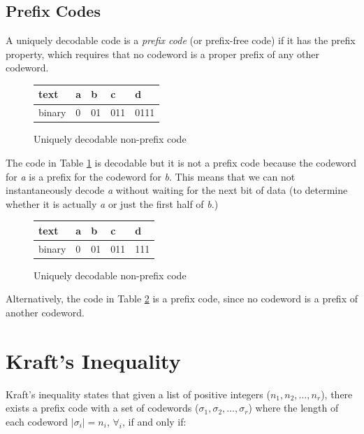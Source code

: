 \documentclass[11pt]{article}
\begin{document}
\subsection{Prefix Codes}
A uniquely decodable code is a \textit{prefix code} (or prefix-free code) if it has the prefix property, which requires that no codeword is a proper prefix of any other codeword.

\begin{figure}[h!]
\begin{center}
\begin{tabular}{| l | l | l | l | l |}
 \hline
  text   & a & b & c & d \\ \hline
  binary & 0 & 01 & 011 & 0111 \\ 
  \hline
\end{tabular}
\caption{Uniquely decodable non-prefix code}
\label{table:non_prefix_code}
\end{center}
\end{figure}

The code in Table \ref{table:non_prefix_code} is decodable but it is not a prefix code because the codeword for \textit{a} is a prefix for the codeword for \textit{b}. This means that we can not instantaneously decode \textit{a} without waiting for the next bit of data (to determine whether it is actually \textit{a} or just the first half of \textit{b}.)

\begin{figure}[h!]
\begin{center}
\begin{tabular}{| l | l | l | l | l |}
 \hline
  text   & a & b & c & d \\ \hline
  binary & 0 & 01 & 011 & 111 \\ 
  \hline
\end{tabular}
\caption{Uniquely decodable non-prefix code}
\label{table:prefix_code}
\end{center}
\end{figure}

Alternatively, the code in Table \ref{table:prefix_code} is a prefix code, since no codeword is a prefix of  another codeword.

\section{Kraft's Inequality}

Kraft's inequality states that given a list of positive integers ($n_{1}, n_{2}, \dots, n_{r}$), there exists a prefix code with a set of codewords ($\sigma_{1}, \sigma_{2}, \dots, \sigma_{r}$) where the length of each codeword $|\sigma_{i}| = n_{i}$, $\forall_{i}$, if and only if:
\end{document}
